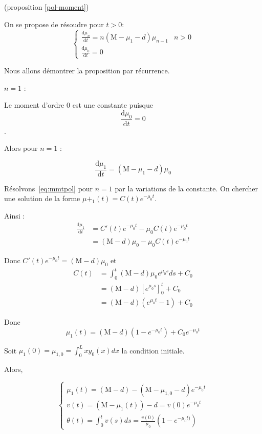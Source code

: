\documentclass[a4paper]{article}
\newcommand{\mass}{\mathrm{M}}
\newcommand{\dep}{d}
\begin{document}
\begin{preuve}
	(proposition \ref{pol-moment})
	
	On se propose de résoudre pour $t>0$:
	\begin{equation}
		\label{eq:mmtpol}
	\begin{cases}
	\displaystyle \frac{\mathrm{d} \mu_n }{\mathrm{d}t} = n(\mass - \mu_1-\dep) \mu_{n-1} & n>0 \\
	\displaystyle \frac{\mathrm{d} \mu_0 }{\mathrm{d}t} = 0
	\end{cases}
	\end{equation}
	
	Nous allons démontrer la proposition par récurrence. 

	\underline{$n=1$} :
	
	Le moment d'ordre 0 est une constante puisque 
	\[\frac{\mathrm{d} \mu_0 }{\mathrm{d}t} = 0\].
	
	Alors pour $n=1$ :
	
	\[\frac{\mathrm{d} \mu_1 }{\mathrm{d}t} = (\mass - \mu_1-\dep) \mu_{0}\]
	
	Résolvons~\eqref{eq:mmtpol} pour $n=1$ par la variations de la constante. 
	On chercher une solution de la forme $\mu+_1(t) = C(t) e^{-\mu_0 t}$.
	
	Ainsi :
	\[
	\begin{split}
		\frac{\mathrm{d} \mu_1 }{\mathrm{d}t} &= C'(t)e^{-\mu_0 t} - \mu_0 C(t)e^{-\mu_0 t} \\
		                                      &= (\mass-\dep) \mu_{0} - \mu_{0} C(t)e^{-\mu_0 t}
	\end{split}
	\]
	
	Donc $C'(t)e^{-\mu_0 t} = (\mass-\dep) \mu_{0} $ et 
	\[
	\begin{split} 
	C(t) &= \int_0^t (\mass-\dep) \mu_{0} e^{\mu_0 s}ds + C_0 \\
	     &= (\mass-\dep)[e^{\mu_0 s}]_0^t + C_0 \\
		 &= (\mass-\dep)(e^{\mu_0 t}-1) + C_0
	\end{split}
	\]
	
	Donc
	 \[ \mu_1 (t) = (\mass - \dep)(1-e^{- \mu_0 t})+C_0 e^{- \mu_0 t} \]
	 
	 Soit $\mu_1(0) = \mu_{1,0} = \int_0^L xy_0(x)dx $ la condition initiale.
	 
	 
	 Alors,

	\begin{equation}
		\begin{cases}
			\mu_1 (t) = (\mass - \dep) - ( \mass - \mu_{1,0} - \dep )e^{- \mu_0 t} \\
			v(t) = ( \mass - \mu_1 (t)) - \dep = v(0)e^{- \mu_0 t}\\
			\theta (t) =  \int_{0}^t v(s)ds = \frac{v(0)}{ \mu_0} (1-e^{-\mu_0 t)})
		\end{cases}
	\end{equation}
	

\end{preuve}
\end{document}

